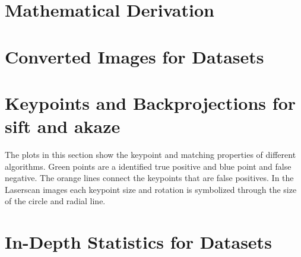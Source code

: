 \documentclass[doktyp=marbeit,fontsize=12pt,sprache=english,hausschrift=true,draft=false]{TUBAFarbeiten}
\begin{document}
\begin{appendix}
    \renewcommand*{\thepage}{\thesection\arabic{page}}
    \renewcommand{\thetable}{\thesection\arabic{table}}
    \renewcommand{\thefigure}{\thesection\arabic{figure}}

    \newpage

    \section{Mathematical Derivation}
    
    \newpage

    \section{Converted Images for Datasets}
    {\setlength{\abovecaptionskip}{-20pt}%
     \setlength{\belowcaptionskip}{-30pt}%
     \setlength{\floatsep}{1pt plus 1pt minus 1pt}%
     \setlength{\textfloatsep}{1pt plus 1.0pt minus 2.0pt}
     \setlength{\intextsep}{1pt plus 1.0pt minus 2.0pt}
    
    
    
    
    }
    \newpage

    \section{Keypoints and Backprojections for \acrshort{sift} and \acrshort{akaze}}
    The plots in this section show the keypoint and matching properties of different algorithms.
    Green points are a identified true positive and blue point and false negative.
    The orange lines connect the keypoints that are false positives.
    In the Laserscan images each keypoint size and rotation is symbolized through the size of the circle and radial line.
    
    
    \newpage

    \section{In-Depth Statistics for Datasets}
    
    
    
    
    \newpage

    
    

    \newpage
    \listoftables

    \newpage
    \listoffigures

    \newpage
\end{appendix}
\end{document}
